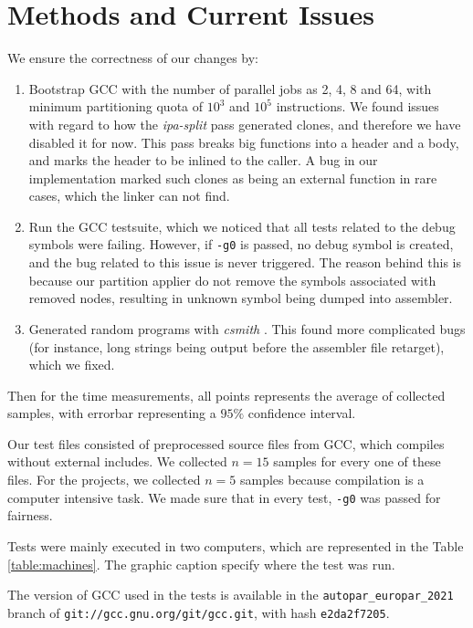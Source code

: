 \documentclass[runningheads]{llncs}
\begin{document}
\section{Methods and Current Issues}\label{sec:methods}

We ensure the correctness of our changes by:
\begin{enumerate}
	\item Bootstrap GCC with the number of parallel jobs as 2, 4, 8 and 64, with
	minimum partitioning quota of $10^3$ and $10^5$ instructions. We found issues
	with regard to how the \textit{ipa-split} pass generated clones, and therefore
	we have disabled it for now. This pass breaks big functions
	into a header and a body, and marks the header to be inlined to the caller.
	A bug in our implementation marked such clones as being an external function in
	rare cases, which the linker can not find.

	\item Run the GCC testsuite, which we noticed that all tests related to the debug
	symbols were failing. However, if \texttt{-g0} is passed, no debug symbol is created,
	and the bug related to this issue is never triggered. The reason behind this is
	because our partition applier do not remove the symbols associated with removed
	nodes, resulting in unknown symbol being dumped into assembler.

	\item Generated random programs with \textit{csmith} \cite{yang2011finding}. This found more complicated
	bugs (for instance, long strings being output before the assembler file retarget),
	which we fixed.
\end{enumerate}

Then for the time measurements, all points represents the average of collected
samples, with errorbar representing a $95\%$ confidence interval.

Our test files consisted of preprocessed source files from GCC, which compiles
without external includes. We collected $n = 15$ samples for every one of these
files. For the projects, we collected $n = 5$ samples because compilation is a
computer intensive task. We made sure that in every test, \texttt{-g0} was passed
for fairness.

Tests were mainly executed in two computers, which are represented
in the Table \ref{table:machines}. The graphic caption specify where the test
was run.

The version of GCC used in the tests is available in the \texttt{autopar\_europar\_2021}
branch of \texttt{git://gcc.gnu.org/git/gcc.git}, with hash \texttt{e2da2f7205}.
\end{document}
